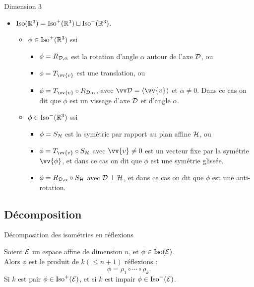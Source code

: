 \documentclass[bigger]{m53beamer}
\begin{document}
\begin{frame}{Dimension 3}
  \begin{itemize}[<+(1)->]
    \item $\operatorname{Iso}(\mathbb{R}^{3}) = \operatorname{Iso}^{+}(\mathbb{R}^{3}) \sqcup \operatorname{Iso}^{-}(\mathbb{R}^{3})$.
      \begin{itemize}[<+(1)->]
        \item $\phi\in\operatorname{Iso}^{+}(\mathbb{R}^{3})$ ssi\pause
          \begin{itemize}[<.(1)->]
            \item $\phi = R_{\mathcal{D},\alpha}$ est la rotation d'angle $\alpha$ autour de l'axe $\mathcal{D}$\pause, ou
            \item $\phi = T_{\vv{v}}$ est une translation\pause, ou
            \item $\phi = T_{\vv{v}}\circ R_{\ens{D},\alpha}$, avec $\ev{D}=\affspan{\vv{v}}$ et $\alpha\neq 0$. \pause Dans ce cas on dit que $\phi$ est un \alert{vissage} d'axe $\mathcal{D}$ et d'angle $\alpha$.
          \end{itemize}
        \item $\phi\in\operatorname{Iso}^{-}(\mathbb{R}^{3})$ ssi\pause
          \begin{itemize}[<.(1)->]
            \item $\phi = S_{\mathcal{H}}$ est la symétrie par rapport au plan affine $\mathcal{H}$\pause, ou
            \item $\phi = T_{\vv{v}}\circ S_{\ens{H}}$ avec $\vv{v}\neq0$ est un vecteur fixe par la symétrie $\vv{\phi}$\pause, et dans ce cas on dit que $\phi$ est une \alert{symétrie glissée}.\pause
            \item $\phi = R_{\mathcal{D},\alpha}\circ S_{\mathcal{H}}$ avec $\mathcal{D}\perp\mathcal{H}$\pause, et dans ce cas on dit que $\phi$ est une \alert{anti-rotation}.
          \end{itemize}
      \end{itemize}\pause
  \end{itemize}
\end{frame}

\subsection{Décomposition}
\begin{frame}{Décomposition des isométries en réflexions}
  \pause
  \begin{proposition}
    Soient $\mathcal{E}$ un espace affine de dimension $n$, et $\phi \in \operatorname{Iso}(\mathcal{E})$.\pause\\
    Alors $\phi$ est le produit de $k (\leq n+1)$ réflexions :
    \[
      \phi = \rho_{1}\circ\cdots\circ\rho_{k}.
    \]\pause
    Si $k$ est pair $\phi \in \operatorname{Iso}^{+}(\mathcal{E})$, et si $k$ est impair $\phi \in \operatorname{Iso}^{-}(\mathcal{E})$.
  \end{proposition}
\end{frame}
\end{document}
